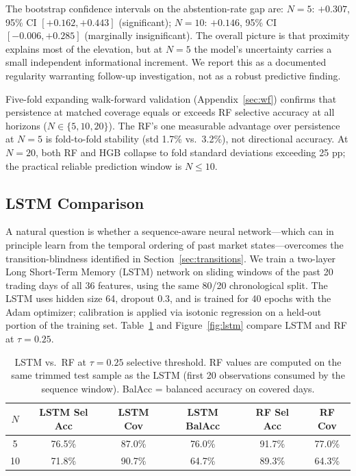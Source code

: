 \documentclass[11pt]{article}
\begin{document}
The bootstrap confidence intervals on the abstention-rate gap are: $N = 5$: $+0.307$, 95\% CI $[+0.162, +0.443]$ (significant); $N = 10$: $+0.146$, 95\% CI $[-0.006, +0.285]$ (marginally insignificant). The overall picture is that proximity explains most of the elevation, but at $N = 5$ the model's uncertainty carries a small independent informational increment. We report this as a documented regularity warranting follow-up investigation, not as a robust predictive finding.

Five-fold expanding walk-forward validation (Appendix~\ref{sec:wf}) confirms that persistence at matched coverage equals or exceeds RF selective accuracy at all horizons ($N \in \{5, 10, 20\}$). The RF's one measurable advantage over persistence at $N = 5$ is fold-to-fold stability (std 1.7\% vs.\ 3.2\%), not directional accuracy. At $N = 20$, both RF and HGB collapse to fold standard deviations exceeding 25 pp; the practical reliable prediction window is $N \leq 10$.

\subsection{LSTM Comparison}
\label{sec:lstm}

A natural question is whether a sequence-aware neural network---which can in principle learn from the temporal ordering of past market states---overcomes the transition-blindness identified in Section~\ref{sec:transitions}. We train a two-layer Long Short-Term Memory (LSTM) network on sliding windows of the past 20 trading days of all 36 features, using the same 80/20 chronological split. The LSTM uses hidden size 64, dropout 0.3, and is trained for 40 epochs with the Adam optimizer; calibration is applied via isotonic regression on a held-out portion of the training set. Table~\ref{tab:lstm} and Figure~\ref{fig:lstm} compare LSTM and RF at $\tau = 0.25$.

\begin{table}[H]
\centering
\caption{LSTM vs.\ RF at $\tau = 0.25$ selective threshold. RF values are computed on the same trimmed test sample as the LSTM (first 20 observations consumed by the sequence window). BalAcc = balanced accuracy on covered days.}
\label{tab:lstm}
\begin{tabular}{cccccc}
\toprule
$N$ & LSTM Sel Acc & LSTM Cov & LSTM BalAcc & RF Sel Acc & RF Cov \\
\midrule
5  & 76.5\% & 87.0\% & 76.0\% & 91.7\% & 77.0\% \\
10 & 71.8\% & 90.7\% & 64.7\% & 89.3\% & 64.3\% \\
\bottomrule
\end{tabular}
\end{table}
\end{document}
